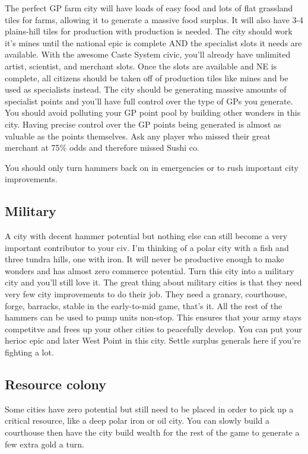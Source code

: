 \documentclass[10pt]{article}
\begin{document}
The perfect GP farm city will have loads of easy food and lots of flat grassland tiles for
farms, allowing it to generate a massive food surplus. It will also have 3-4 plains-hill tiles
for production with production is needed. The city should work it's mines until the national
epic is complete AND the specialist slots it needs are available. With the awesome Caste System
civic, you'll already have unlimited artist, scientist, and merchant slots. Once the slots are
available and NE is complete, all citizens should be taken off of production tiles like mines
and be used as specialists instead. The city should be generating massive amounts of specialist
points and you'll have full control over the type of GPs you generate. You should avoid polluting
your GP point pool by building other wonders in this city. Having precise control over the GP
points being generated is almost as valuable as the points themselves. Ask any player who missed
their great merchant at 75\% odds and therefore missed Sushi co.

You should only turn hammers back on in emergencies or to rush important city improvements.

\subsection*{Military}

A city with decent hammer potential but nothing else can still become a very important
contributor to your civ. I'm thinking of a polar city with a fish and three tundra hills, one with
iron. It will never be productive enough to make wonders and has almost zero commerce potential.
Turn this city into a military city and you'll still love it. The great thing about military cities is
that they need very few city improvements to do their job. They need a granary, courthouse, forge, barracks,
stable in the early-to-mid game, that's it. All the rest of the hammers can be used to pump units non-stop.
This ensures that your army stays competitve and frees up your other cities to peacefully develop. You can
put your herioc epic and later West Point in this city. Settle surplus generals here if you're fighting a lot.

\subsection*{Resource colony}

Some cities have zero potential but still need to be placed in order to pick up a critical resource, like
a deep polar iron or oil city. You can slowly build a courthouse then have the city build wealth for the
rest of the game to generate a few extra gold a turn.
\end{document}
